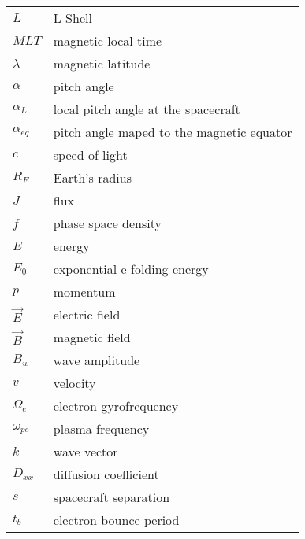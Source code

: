 
\begin{tabular}{l l}
  $L$ & L-Shell \\
  $MLT$ & magnetic local time\\
  $\lambda$ & magnetic latitude \\
  $\alpha$ & pitch angle \\
  $\alpha_L$ & local pitch angle at the spacecraft \\
  $\alpha_{eq}$ & pitch angle maped to the magnetic equator \\
  $c$ & speed of light \\
  $R_E$ & Earth's radius \\
  $J$ & flux \\
  $f$ & phase space density \\
  $E$ & energy \\
  $E_0$ & exponential e-folding energy \\
  $p$ & momentum \\
  $\vec{E}$ & electric field \\
  $\vec{B}$ & magnetic field \\
  $B_w$ & wave amplitude \\
  $v$ & velocity \\
  $\Omega_e$ & electron gyrofrequency \\
  $\omega_{pe}$ & plasma frequency \\
  $k$ & wave vector \\
  $D_{xx}$ & diffusion coefficient \\ 
  $s$ & spacecraft separation \\
  $t_b$ & electron bounce period
  
\end{tabular}
